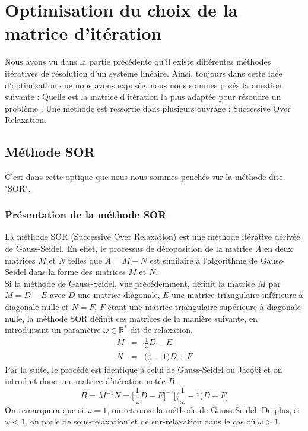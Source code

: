 \chapter{Optimisation du choix de la matrice d'itération}
Nous avons vu dans la partie précédente qu'il existe différentes méthodes itératives de résolution d'un système linéaire. Ainsi, toujours dans cette idée d'optimisation que nous avons exposée, nous nous sommes posés la question suivante : \og Quelle est la matrice d'itération la plus adaptée pour résoudre un problème \fg. Une méthode est ressortie dans plusieurs ouvrage : Successive Over Relaxation.
\section{Méthode SOR}
C'est dans cette optique que nous nous sommes penchés sur la méthode dite "SOR".
\subsection{Présentation de la méthode SOR}
La méthode SOR (Successive Over Relaxation) est une méthode itérative dérivée de Gauss-Seidel. En effet, le processus de décoposition de la matrice $A$ en deux matrices $M$ et $N$ telles que $A=M-N$ est similaire à l'algorithme de Gauss-Seidel dans la forme des matrices $M$ et $N$.\\

Si la méthode de Gauss-Seidel, vue précédemment, définit la matrice $M$ par $M=D-E$ avec $D$ une matrice diagonale, $E$ une matrice triangulaire inférieure à diagonale nulle et $N=F$, $F$ étant une matrice triangulaire supérieure à diagonale nulle, la méthode SOR définit ces matrices de la manière suivante, en introduisant un paramètre $\omega \in \mathbb{R}^*$ dit de relaxation.
\begin{eqnarray}
M &=& \frac{1}{\omega}D-E\\
N &=& \bigg(\frac{1}{\omega}-1\bigg)D+F
\end{eqnarray}
Par la suite, le procédé est identique à celui de Gauss-Seidel ou Jacobi et on introduit donc une matrice d'itération notée $B$.
\begin{equation}
B=M^{-1}N=\bigg[\frac{1}{\omega}D-E\bigg]^{-1}\bigg[\bigg(\frac{1}{\omega}-1\bigg)D+F\bigg]
\end{equation}
On remarquera que si $\omega=1$, on retrouve la méthode de Gauss-Seidel. De plus, si $\omega<1$, on parle de sous-relaxation et de sur-relaxation dans le cas où $\omega>1$.
